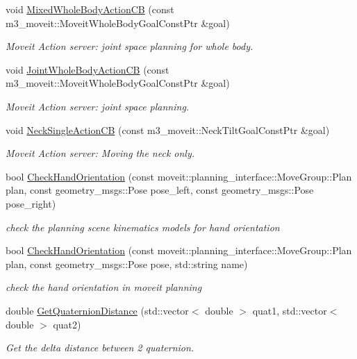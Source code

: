 \begin{DoxyCompactItemize}
void \hyperlink{classM3MoveGroup_a3cb5511476fb082b891ac3de867ee8b8}{Mixed\+Whole\+Body\+Action\+CB} (const m3\+\_\+moveit\+::\+Moveit\+Whole\+Body\+Goal\+Const\+Ptr \&goal)
\begin{DoxyCompactList}\small\item\em Moveit Action server\+: joint space planning for whole body. \end{DoxyCompactList}\item 
void \hyperlink{classM3MoveGroup_adcf08e40ebf2191e9d717e2baf275f18}{Joint\+Whole\+Body\+Action\+CB} (const m3\+\_\+moveit\+::\+Moveit\+Whole\+Body\+Goal\+Const\+Ptr \&goal)
\begin{DoxyCompactList}\small\item\em Moveit Action server\+: joint space planning. \end{DoxyCompactList}\item 
void \hyperlink{classM3MoveGroup_aef5fd5bd7565b10b0e5d568bce824773}{Neck\+Single\+Action\+CB} (const m3\+\_\+moveit\+::\+Neck\+Tilt\+Goal\+Const\+Ptr \&goal)
\begin{DoxyCompactList}\small\item\em Moveit Action server\+: Moving the neck only. \end{DoxyCompactList}\item 
bool \hyperlink{classM3MoveGroup_a65ac544bc2275fc3823bc66c3a2a7a19}{Check\+Hand\+Orientation} (const moveit\+::planning\+\_\+interface\+::\+Move\+Group\+::\+Plan plan, const geometry\+\_\+msgs\+::\+Pose pose\+\_\+left, const geometry\+\_\+msgs\+::\+Pose pose\+\_\+right)
\begin{DoxyCompactList}\small\item\em check the planning scene kinematics models for hand orientation \end{DoxyCompactList}\item 
bool \hyperlink{classM3MoveGroup_a89b6d3658b6884d6a19a2975193e444a}{Check\+Hand\+Orientation} (const moveit\+::planning\+\_\+interface\+::\+Move\+Group\+::\+Plan plan, const geometry\+\_\+msgs\+::\+Pose pose, std\+::string name)
\begin{DoxyCompactList}\small\item\em check the hand orientation in moveit planning \end{DoxyCompactList}\item 
double \hyperlink{classM3MoveGroup_a000211da0f2ad520583f9efff2401e7a}{Get\+Quaternion\+Distance} (std\+::vector$<$ double $>$ quat1, std\+::vector$<$ double $>$ quat2)
\begin{DoxyCompactList}\small\item\em Get the delta distance between 2 quaternion. \end{DoxyCompactList}\item 

\end{DoxyCompactItemize}

